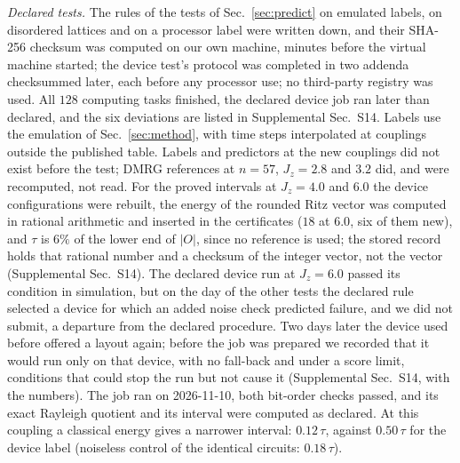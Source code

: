 \documentclass[aps,prx,twocolumn,10pt,superscriptaddress,nofootinbib,longbibliography,floatfix]{revtex4-2}
\theoremstyle{remark}
\newcommand{\Jz}{J_z}
\begin{document}
\emph{Declared tests.} The rules of the tests of Sec.~\ref{sec:predict} on emulated labels, on disordered lattices and on
a processor label were written down, and their SHA-256 checksum was %
computed on our own machine, minutes before the virtual machine started; the device test's protocol was completed in
two addenda checksummed later, each before any processor use; no third-party registry was used. All $128$ %
computing tasks finished, the declared device job ran later than declared, and the six deviations are listed in Supplemental
Sec.~S14. Labels use the %
emulation of Sec.~\ref{sec:method}, with time steps interpolated at couplings outside the published table. Labels and
predictors at the new couplings did not exist before the test; DMRG references at $n=57$, $\Jz=2.8$ and $3.2$ did, and %
were recomputed, not read. %
For the proved intervals at $\Jz=4.0$ and $6.0$ the device configurations were rebuilt, the energy of the rounded Ritz %
vector was computed in rational arithmetic and inserted in the certificates ($18$ at $6.0$, six of them new), and $\tau$ %
is $6\%$ of the lower end of $|O|$, since no reference is used; the stored record holds that rational number and a %
checksum of the integer vector, not the vector (Supplemental Sec.~S14). The declared device run at $\Jz=6.0$ passed its %
condition in simulation, but on the day of the other tests the declared rule selected a device for which an
added noise check predicted failure, and we did not submit, a departure from the declared procedure. Two days
later the device used before offered a layout again; before the job was prepared we recorded that it would run
only on that device, with no fall-back and under a score limit, conditions that could stop the run but not
cause it (Supplemental Sec.~S14, with the numbers). The job ran on 2026-11-10, both bit-order checks passed, and %
its exact Rayleigh quotient and its interval were computed as declared. At this coupling a
classical energy gives a narrower interval: $0.12\,\tau$, against $0.50\,\tau$ for the device label (noiseless control %
of the identical circuits: $0.18\,\tau$). %
\end{document}
